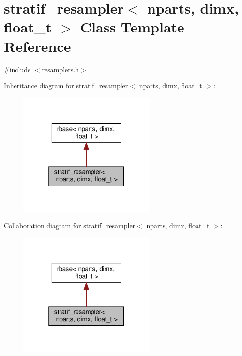 \hypertarget{classstratif__resampler}{}\section{stratif\+\_\+resampler$<$ nparts, dimx, float\+\_\+t $>$ Class Template Reference}
\label{classstratif__resampler}


{\ttfamily \#include $<$resamplers.\+h$>$}



Inheritance diagram for stratif\+\_\+resampler$<$ nparts, dimx, float\+\_\+t $>$\+:\nopagebreak
\begin{figure}[H]
\begin{center}
\leavevmode
\includegraphics[width=196pt]{classstratif__resampler__inherit__graph}
\end{center}
\end{figure}


Collaboration diagram for stratif\+\_\+resampler$<$ nparts, dimx, float\+\_\+t $>$\+:\nopagebreak
\begin{figure}[H]
\begin{center}
\leavevmode
\includegraphics[width=196pt]{classstratif__resampler__coll__graph}
\end{center}
\end{figure}
